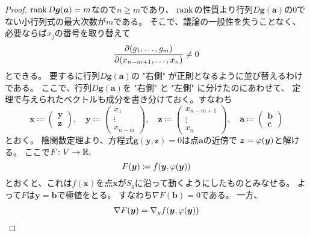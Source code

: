 \documentclass[report]{jlreq}
\begin{document}
\begin{proof}
    $\operatorname{rank} D\bm{g}(\bm{a}) = m$なので$n \ge m$であり、
    $\operatorname{rank}$の性質より行列$D\bm{g}(\bm{a})$の$0$でない小行列式の最大次数が$m$である。
    そこで、議論の一般性を失うことなく、必要ならば$x_j$の番号を取り替えて
    \begin{equation}
        \deldel[(g_1, \dots, g_m)]{(x_{n-m+1}, \dots, x_{n})} \neq 0
    \end{equation}
    とできる。
    要するに行列$D\bm{g}(\bm{a})$の "右側" が正則となるように並び替えるわけである。
    ここで、行列$D\bm{g}(\bm{a})$を "右側" と "左側" に分けたのにあわせて、
    定理で与えられたベクトルも成分を書き分けておく。すなわち
    \begin{equation}
        \bm{x} \coloneqq \begin{pmatrix}
            \bm{y} \\
            \bm{z}
        \end{pmatrix},
        \quad
        \bm{y} \coloneqq \begin{pmatrix}
            x_1 \\
            \vdots \\
            x_{n-m}
        \end{pmatrix},
        \quad
        \bm{z} \coloneqq \begin{pmatrix}
            x_{n-m+1} \\
            \vdots \\
            x_{n}
        \end{pmatrix},
        \quad
        \bm{a} \coloneqq \begin{pmatrix}
            \bm{b} \\
            \bm{c}
        \end{pmatrix}
    \end{equation}
    とおく。
    陰関数定理より、方程式$\bm{g}(\bm{y}, \bm{z}) = 0$は点$\bm{a}$の近傍で
    $\bm{z} = \varphi(\bm{y})$と解ける。
    ここで$F \colon V \to \mathbb{R},$
    \begin{equation}
        F(\bm{y}) \coloneqq f(\bm{y}, \varphi(\bm{y}))
    \end{equation}
    とおくと、これは$f(\bm{x})$を点$\bm{x}$が$S_g$に沿って動くようにしたものとみなせる。
    よって$F$は$\bm{y} = \bm{b}$で極値をとる。
    すなわち$\nabla F(\bm{b}) = 0$である。
    一方、
    \begin{equation}
        \begin{alignedat}{2}
            \nabla F(\bm{y})
                &= \nabla_y f(\bm{y}, \phai(\bm{y}))

\end{alignedat}
\end{equation}
\end{proof}
\end{document}
